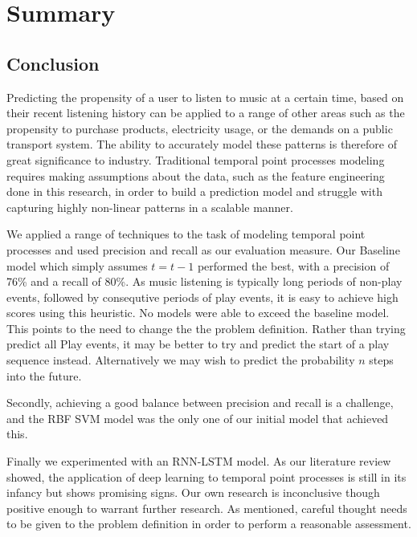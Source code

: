 
\chapter{Summary} %

\label{Chapter6} 

\section{Conclusion}

Predicting the propensity of a user to listen to music at a certain time, based on their recent listening history can be applied to a range of other areas such as the propensity to purchase products, electricity usage, or the demands on a public transport system. The ability to accurately model these patterns is therefore of great significance to industry. Traditional temporal point processes modeling requires making assumptions about the data, such as the feature engineering done in this research, in order to build a prediction model and struggle with capturing highly non-linear patterns in a scalable manner. 

We applied a range of techniques to the task of modeling temporal point processes and used precision and recall as our evaluation measure. Our Baseline model which simply assumes $t = t-1$ performed the best, with a precision of 76\% and a recall of 80\%. As music listening is typically long periods of non-play events, followed by consequtive periods of play events, it is easy to achieve high scores using this heuristic. No models were able to exceed the baseline model. This points to the need to change the the problem definition. Rather than trying predict all Play events, it may be better to try and predict the start of a play sequence instead. Alternatively we may wish to predict the probability $n$ steps into the future.

Secondly, achieving a good balance between precision and recall is a challenge, and the RBF SVM model was the only one of our initial model that achieved this.

Finally we experimented with an RNN-LSTM model. As our literature review showed, the application of deep learning to temporal point processes is still in its infancy but shows promising signs. Our own research is inconclusive though positive enough to warrant further research. As mentioned, careful thought needs to be given to the problem definition in order to perform a reasonable assessment. 


